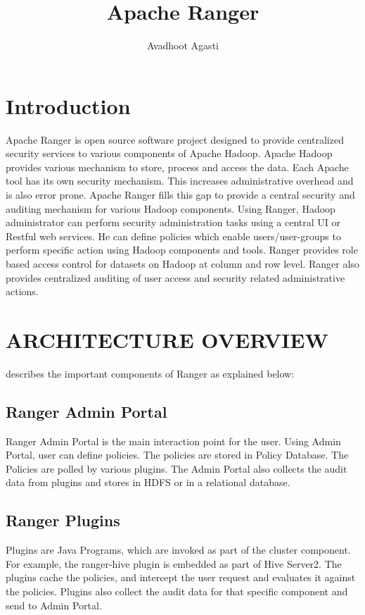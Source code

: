 \documentclass[9pt,twocolumn,twoside]{styles/osajnl}
\title{Apache Ranger}
\author[1,*, +]{Avadhoot Agasti}
\affil[1]{School of Informatics and Computing, Bloomington, IN 47408, U.S.A.}
\affil[*]{Corresponding authors: aagasti@indiana.edu}
\affil[+]{HID - SL-IO-3000}
\begin{document}
\maketitle

\section{Introduction}

Apache Ranger is open source software project designed to provide centralized
 security services to various components of Apache Hadoop. Apache Hadoop
 provides various mechanism to store, process and access the data. Each
 Apache tool has its own security mechanism. This increases administrative
 overhead and is also error prone. Apache Ranger fills this gap to provide
 a central security and auditing mechanism for various Hadoop components. Using
  Ranger, Hadoop administrator can perform security administration tasks
  using a central UI or Restful web services. He can define policies which
  enable users/user-groups to perform specific action using Hadoop components
   and tools. Ranger provides role based access control for datasets on
   Hadoop at column and row level. Ranger also provides centralized auditing
   of user access and security related administrative actions.

\section{ARCHITECTURE OVERVIEW}

\cite{www-ranger-architecture} describes the important components of Ranger as
 explained below:

\subsection{Ranger Admin Portal}

Ranger Admin Portal is the main interaction point for the user. Using Admin
Portal, user can define policies. The policies are stored in Policy Database.
 The Policies are polled by various plugins. The Admin Portal also collects
 the audit data from plugins and stores in HDFS or in a relational database.

\subsection{Ranger Plugins}

Plugins are Java Programs, which are invoked as part of the cluster component.
 For example, the ranger-hive plugin is embedded as part of Hive Server2. The
  plugins cache the policies, and intercept the user request and evaluates it
   against the policies. Plugins also collect the audit data for that
   specific component and send to Admin Portal.
\end{document}
